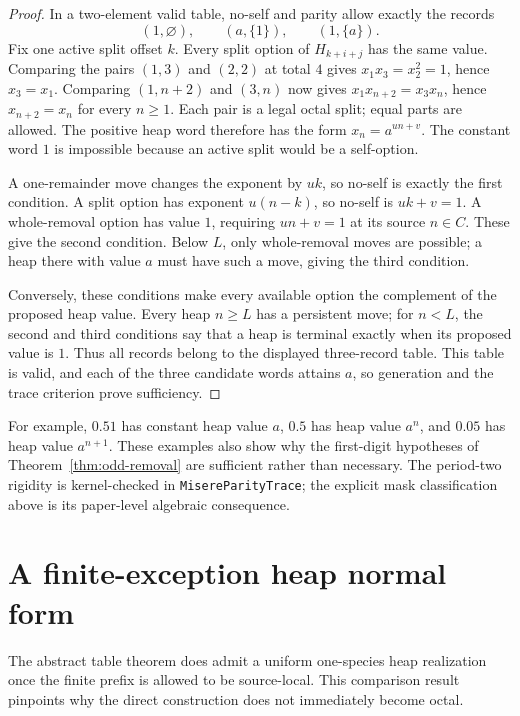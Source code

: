 \documentclass[11pt]{article}
\theoremstyle{definition}
\theoremstyle{remark}
\begin{document}
\begin{proof}
In a two-element valid table, no-self and parity allow exactly the records
\[
 (1,\varnothing),\qquad(a,\{1\}),\qquad(1,\{a\}).
\]
Fix one active split offset $k$.  Every split option of $H_{k+i+j}$ has
the same value.  Comparing the pairs $(1,3)$ and $(2,2)$ at total $4$
gives $x_1x_3=x_2^2=1$, hence $x_3=x_1$.  Comparing $(1,n+2)$ and
$(3,n)$ now gives $x_1x_{n+2}=x_3x_n$, hence
$x_{n+2}=x_n$ for every $n\ge1$.  Each pair is a legal octal split;
equal parts are allowed.  The positive heap word therefore has the form
$x_n=a^{un+v}$.  The constant word $1$ is impossible because an active
split would be a self-option.

A one-remainder move changes the exponent by $uk$, so no-self is exactly
the first condition.  A split option has exponent $u(n-k)$, so no-self
is $uk+v=1$.  A whole-removal option has value $1$, requiring
$un+v=1$ at its source $n\in C$.  These give
the second condition.  Below $L$, only whole-removal moves are possible;
a heap there with value $a$ must have such a move, giving
the third condition.

Conversely, these conditions make every available option the complement of
the proposed heap value.  Every heap $n\ge L$ has a persistent move; for
$n<L$, the second and third conditions say that a heap is terminal exactly when its
proposed value is $1$.  Thus all records belong to the displayed
three-record table.  This table is valid, and each of the three candidate
words attains $a$, so generation and the trace criterion prove sufficiency.
\end{proof}

For example, $0.51$ has constant heap value $a$, $0.5$ has heap value
$a^n$, and $0.05$ has heap value $a^{n+1}$.  These examples also show why
the first-digit hypotheses of Theorem~\ref{thm:odd-removal} are sufficient
rather than necessary.  The period-two rigidity is kernel-checked in
\texttt{MisereParityTrace}; the explicit mask classification above is its
paper-level algebraic consequence.

\section{A finite-exception heap normal form}\label{sec:normalform}

The abstract table theorem does admit a uniform one-species heap realization
once the finite prefix is allowed to be source-local.  This comparison result
pinpoints why the direct construction does not immediately become octal.
\end{document}

